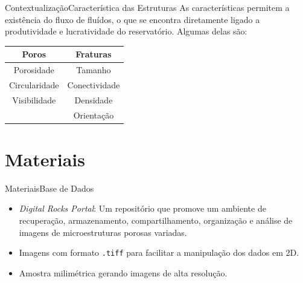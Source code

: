\documentclass{beamer}
\begin{document}
\begin{frame}{Contextualização}{Característica das Estruturas}
   As características permitem a existência do fluxo de fluídos, o que se encontra diretamente ligado a produtividade e lucratividade do reservatório. Algumas delas são:
   
    \begin{table}[]
        \begin{tabular}{c|c}
       \textbf{Poros}         &  \textbf{Fraturas}      \\ \hline
        Porosidade            & Tamanho       \\
        Circularidade         & Conectividade \\
        Visibilidade          & Densidade     \\
        \multicolumn{1}{l|}{} & Orientação   
        \end{tabular}
    \end{table}
\end{frame}

\section{Materiais}
\begin{frame}{Materiais}{Base de Dados}
    \begin{itemize}
        \item \textit{Digital Rocks Portal}: Um repositório que promove um ambiente de recuperação, armazenamento, compartilhamento, organização e análise de imagens de microestruturas porosas variadas.
        \item Imagens com formato \texttt{.tiff} para facilitar a manipulação dos dados em 2D.
        \item Amostra milimétrica gerando imagens de alta resolução. 
    \end{itemize}
    
\end{frame}
\end{document}
